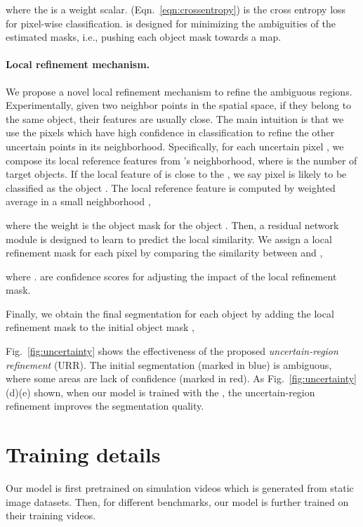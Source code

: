 \documentclass{article}
\begin{document}
where the  is a weight scalar.
 (Eqn.~\ref{eqn:crossentropy}) is the cross entropy loss for pixel-wise classification. 
 is designed for minimizing the ambiguities of the estimated masks, i.e., pushing each object mask towards a  map.

\paragraph{Local refinement mechanism.}
We propose a novel local refinement mechanism to refine the ambiguous regions.
Experimentally, given two neighbor points in the spatial space, if they belong to the same object, their features are usually close.
The main intuition is that we use the pixels which have high confidence in classification to refine the other uncertain points in its neighborhood.
Specifically, for each uncertain pixel , we compose its local reference features  from 's neighborhood, where  is the number of target objects.
If the local feature  of  is close to the , we say pixel  is likely to be classified as the object .
The local reference feature  is computed by weighted average in a small neighborhood ,

where the weight  is the object mask for the object .
Then, a residual network module  is designed to learn to predict the local similarity.
We assign a local refinement mask  for each pixel  by comparing the similarity between  and ,

where .
 are confidence scores for adjusting the impact of the local refinement mask.

Finally, we obtain the final segmentation  for each object  by adding the local refinement mask  to the initial object mask ,


Fig.~\ref{fig:uncertainty} shows the effectiveness of the proposed \emph{uncertain-region refinement} (URR).
The initial segmentation (marked in blue) is ambiguous, where some areas are lack of confidence (marked in red).
As Fig.~\ref{fig:uncertainty} (d)(e) shown, when our model is trained with the , the uncertain-region refinement improves the segmentation quality.


\section{Training details}

Our model is first pretrained on simulation videos which is generated from static image datasets.
Then, for different benchmarks, our model is further trained on their training videos.
\end{document}
